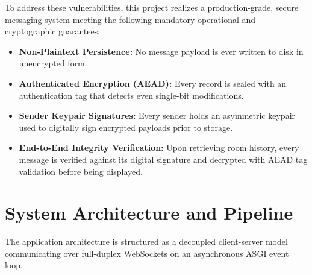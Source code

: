 \documentclass[11pt,a4paper]{article}
\begin{document}
To address these vulnerabilities, this project realizes a production-grade, secure messaging system meeting the following mandatory operational and cryptographic guarantees:
\begin{itemize}
    \item \textbf{Non-Plaintext Persistence:} No message payload is ever written to disk in unencrypted form.
    \item \textbf{Authenticated Encryption (AEAD):} Every record is sealed with an authentication tag that detects even single-bit modifications.
    \item \textbf{Sender Keypair Signatures:} Every sender holds an asymmetric keypair used to digitally sign encrypted payloads prior to storage.
    \item \textbf{End-to-End Integrity Verification:} Upon retrieving room history, every message is verified against its digital signature and decrypted with AEAD tag validation before being displayed.
\end{itemize}

\section{System Architecture and Pipeline}
The application architecture is structured as a decoupled client-server model communicating over full-duplex WebSockets on an asynchronous ASGI event loop.
\end{document}
